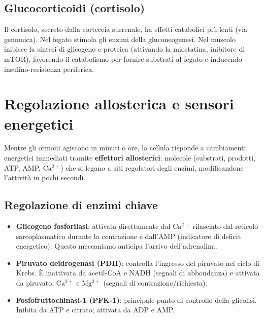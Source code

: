 \documentclass[12pt,a4paper]{report}
\begin{document}
\subsection{Glucocorticoidi (cortisolo)}
Il cortisolo, secreto dalla corteccia surrenale, ha effetti catabolici più lenti (via genomica). Nel fegato stimola gli enzimi della gluconeogenesi. Nel muscolo inibisce la sintesi di glicogeno e proteica (attivando la miostatina, inibitore di mTOR), favorendo il catabolismo per fornire substrati al fegato e inducendo insulino-resistenza periferica.

\section{Regolazione allosterica e sensori energetici}
Mentre gli ormoni agiscono in minuti o ore, la cellula risponde a cambiamenti energetici immediati tramite \textbf{effettori allosterici}: molecole (substrati, prodotti, ATP, AMP, $\mathrm{Ca^{2+}}$) che si legano a siti regolatori degli enzimi, modificandone l'attività in pochi secondi.
\subsection{Regolazione di enzimi chiave}
\begin{itemize}
\item \textbf{Glicogeno fosforilasi}: attivata direttamente dal $\mathrm{Ca^{2+}}$ rilasciato dal reticolo sarcoplasmatico durante la contrazione e dall'AMP (indicatore di deficit energetico). Questo meccanismo anticipa l'arrivo dell'adrenalina.
\item \textbf{Piruvato deidrogenasi (PDH)}: controlla l'ingresso del piruvato nel ciclo di Krebs. È inattivata da acetil-CoA e NADH (segnali di abbondanza) e attivata da piruvato, $\mathrm{Ca^{2+}}$ e $\mathrm{Mg^{2+}}$ (segnali di contrazione/richiesta).
\item \textbf{Fosfofruttochinasi-1 (PFK-1)}: principale punto di controllo della glicolisi. Inibita da ATP e citrato; attivata da ADP e AMP.
\end{itemize}
\end{document}
